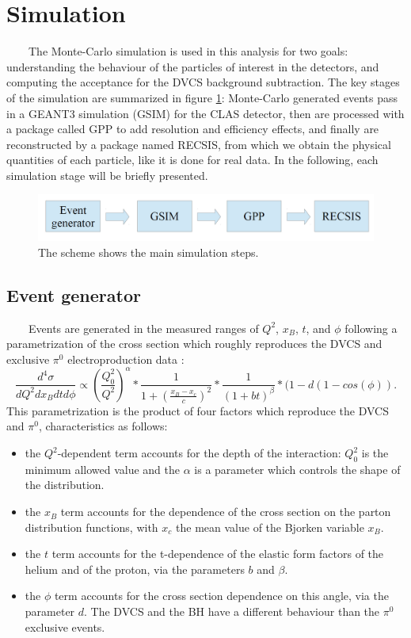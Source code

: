 \section{Simulation}
~~~~The Monte-Carlo simulation is used in this analysis for two goals: understanding the behaviour of the particles of interest in the detectors, and computing the acceptance for the DVCS background subtraction. The key stages of the simulation are summarized in figure \ref{fig:simulation_steps}: Monte-Carlo generated events pass in a GEANT3 simulation (GSIM) for the CLAS detector, then are processed with a package called GPP to add resolution and efficiency effects, and finally are reconstructed by a package named RECSIS, from which we obtain the physical quantities of each particle, like it is done for real data. In the following, each simulation stage will be briefly presented.
\begin{figure}[tbp]
\centering
\includegraphics[scale=0.25]{fig_simulation/simulation_steps.png}
\caption{ The scheme shows the main simulation steps.} 
\label{fig:simulation_steps}
\end{figure}

\subsection{Event generator} \label{Event_generator}
~~~~Events are generated in the measured ranges of $Q^{2}$, $x_{B}$, $t$, and 
$\phi$ following a parametrization of the cross section which roughly 
reproduces the DVCS and exclusive $\pi^{0}$ electroproduction data 
\cite{FX_thesis}:
\begin{equation}
\frac{d^{4}\sigma}{dQ^{2}dx_{B}dtd\phi} \propto \left(\frac{Q^{2}_{0}}{Q^{2}}\right)^{\alpha} *  \frac{1}{1 + (\frac{x_{B} - x_{c}}{c})^{2}} * \frac{1}{(1+bt)^{\beta}} * (1-d(1-cos(\phi)).
\label{equ:event_generator}
\end{equation}
This parametrization is the product of four factors which reproduce the DVCS and $\pi^{0}$,  characteristics as follows:
\begin{itemize}
\item the $Q^{2}$-dependent term accounts for the depth of the interaction: $Q^{2}_{0}$ is the minimum allowed value and the $\alpha$ is a parameter which controls the shape of the distribution.   
\item the $x_{B}$ term accounts for the dependence of the cross section on the parton distribution functions, with $x_{c}$ the mean value of the Bjorken variable $x_{B}$.
\item the $t$ term accounts for the t-dependence of the elastic form factors of the helium and of the proton, via the parameters $b$ and $\beta$.
\item the $\phi$ term accounts for the cross section dependence on this angle, via the parameter $d$. The DVCS and the BH have a different behaviour than the $\pi^{0}$ exclusive events. 
\end{itemize}

